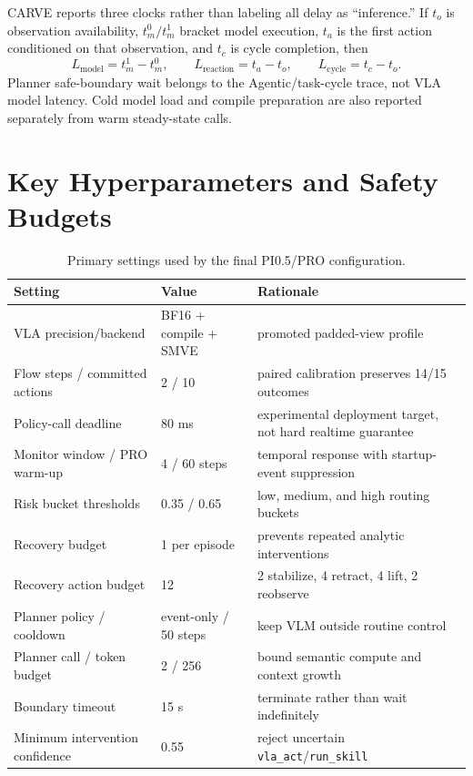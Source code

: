 \documentclass[runningheads]{waica}
\begin{document}
CARVE reports three clocks rather than labeling all delay as ``inference.'' If
$t_o$ is observation availability, $t_m^0/t_m^1$ bracket model execution,
$t_a$ is the first action conditioned on that observation, and $t_c$ is cycle
completion, then
\begin{equation}
L_{\mathrm{model}}=t_m^1-t_m^0,\qquad
L_{\mathrm{reaction}}=t_a-t_o,\qquad
L_{\mathrm{cycle}}=t_c-t_o.
\end{equation}
Planner safe-boundary wait belongs to the Agentic/task-cycle trace, not VLA
model latency. Cold model load and compile preparation are also reported
separately from warm steady-state calls.

\section{Key Hyperparameters and Safety Budgets}
\label{app:settings}

\begin{table}
\caption{Primary settings used by the final PI0.5/PRO configuration.}
\label{tab:settings}
\centering
\small
\begin{tabularx}{\textwidth}{p{}p{}X}
\toprule
Setting & Value & Rationale \\
\midrule
VLA precision/backend & BF16 + compile + SMVE & promoted padded-view profile \\
Flow steps / committed actions & 2 / 10 & paired calibration preserves 14/15 outcomes \\
Policy-call deadline & 80 ms & experimental deployment target, not hard realtime guarantee \\
Monitor window / PRO warm-up & 4 / 60 steps & temporal response with startup-event suppression \\
Risk bucket thresholds & 0.35 / 0.65 & low, medium, and high routing buckets \\
Recovery budget & 1 per episode & prevents repeated analytic interventions \\
Recovery action budget & 12 & 2 stabilize, 4 retract, 4 lift, 2 reobserve \\
Planner policy / cooldown & event-only / 50 steps & keep VLM outside routine control \\
Planner call / token budget & 2 / 256 & bound semantic compute and context growth \\
Boundary timeout & 15 s & terminate rather than wait indefinitely \\
Minimum intervention confidence & 0.55 & reject uncertain \texttt{vla\_act}/\texttt{run\_skill} \\
\bottomrule
\end{tabularx}
\end{table}
\end{document}
